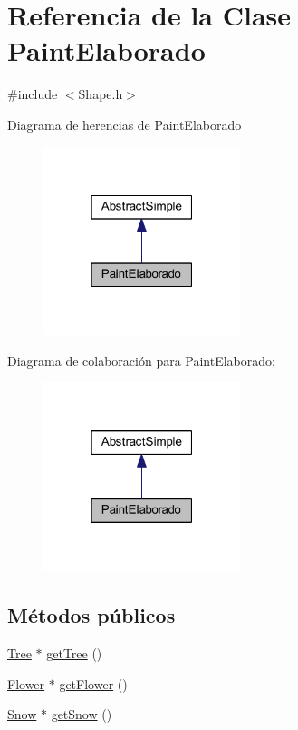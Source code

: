 \hypertarget{class_paint_elaborado}{}\section{Referencia de la Clase Paint\+Elaborado}
\label{class_paint_elaborado}


{\ttfamily \#include $<$Shape.\+h$>$}



Diagrama de herencias de Paint\+Elaborado
\nopagebreak
\begin{figure}[H]
\begin{center}
\leavevmode
\includegraphics[width=163pt]{class_paint_elaborado__inherit__graph}
\end{center}
\end{figure}


Diagrama de colaboración para Paint\+Elaborado\+:
\nopagebreak
\begin{figure}[H]
\begin{center}
\leavevmode
\includegraphics[width=163pt]{class_paint_elaborado__coll__graph}
\end{center}
\end{figure}
\subsection*{Métodos públicos}
\begin{DoxyCompactItemize}
\item 
\mbox{\hyperlink{class_tree}{Tree}} $\ast$ \mbox{\hyperlink{class_paint_elaborado_abaa86a2ff7ea9200eef2e000e1ee9bc7}{get\+Tree}} ()
\item 
\mbox{\hyperlink{class_flower}{Flower}} $\ast$ \mbox{\hyperlink{class_paint_elaborado_a67f3983a3aa69376424208afaadc062d}{get\+Flower}} ()
\item 
\mbox{\hyperlink{class_snow}{Snow}} $\ast$ \mbox{\hyperlink{class_paint_elaborado_af14e00829a13a93b28f137f7dd20474d}{get\+Snow}} ()
\end{DoxyCompactItemize}



